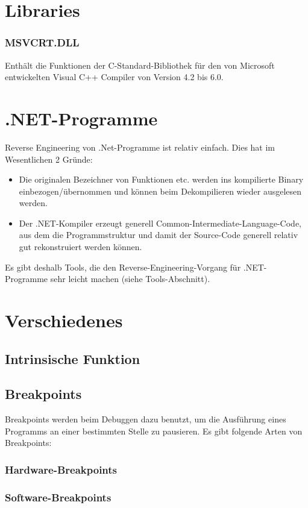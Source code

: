 \section{Libraries}
\subsubsection{MSVCRT.DLL}
Enthält die Funktionen der C-Standard-Bibliothek für den von Microsoft entwickelten Visual C++ Compiler von Version 4.2 bis 6.0.
\section{.NET-Programme}
Reverse Engineering von .Net-Programme ist relativ einfach. Dies hat im Wesentlichen 2 Gründe:
\begin{itemize}
\item Die originalen Bezeichner von Funktionen etc. werden ins kompilierte Binary einbezogen/übernommen und können beim Dekompilieren wieder ausgelesen werden.
\item Der .NET-Kompiler erzeugt generell Common-Intermediate-Language-Code, aus dem die Programmstruktur und damit der Source-Code generell relativ gut rekonstruiert werden können.
\end{itemize}
Es gibt deshalb Tools, die den Reverse-Engineering-Vorgang für .NET-Programme sehr leicht machen (siehe Tools-Abschnitt).
\section{Verschiedenes}
\subsection{Intrinsische Funktion}
\subsection{Breakpoints}
Breakpoints werden beim Debuggen dazu benutzt, um die Ausführung eines Programms an einer bestimmten Stelle zu pausieren. Es gibt folgende Arten von Breakpoints:
\subsubsection{Hardware-Breakpoints}

\subsubsection{Software-Breakpoints}


\clearpage
